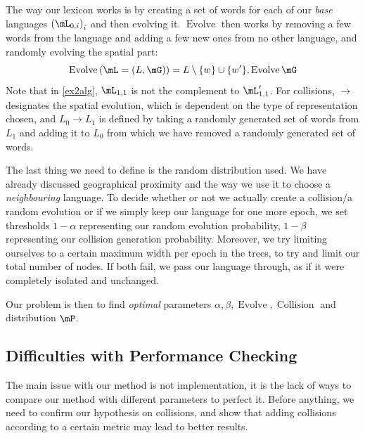 \documentclass[math, info, english]{cours}
\DeclareMathOperator{\revo}{Evolve}
\DeclareMathOperator{\coll}{Collision}
\begin{document}
The way our lexicon works is by creating a set of words for each of our \emph{base} languages $\left(\mL_{0, i}\right)_{i}$ and then evolving it.
$\revo$ then works by removing a few words from the language and adding a few new ones from no other language, and randomly evolving the spatial part:
\begin{equation*}
	\revo\left( \mL = \left(L, \mG\right) \right) = L \setminus \{w\} \cup \{w'\}, \revo\mG
\end{equation*}
Note that in \ref{ex2alg}, $\mL_{1, 1}$ is not the complement to $\mL'_{1, 1}$.
For collisions, $\to$ designates the spatial evolution, which is dependent on the type of representation chosen, and $L_{0} \to L_{1}$ is defined by taking a randomly generated set of words from $L_{1}$ and adding it to $L_{0}$ from which we have removed a randomly generated set of words.


The last thing we need to define is the random distribution used.
We have already discussed geographical proximity and the way we use it to choose a \emph{neighbouring} language.
To decide whether or not we actually create a collision/a random evolution or if we simply keep our language for one more epoch, we set thresholds $1 - \alpha$ representing our random evolution probability, $1 - \beta$ representing our collision generation probability.
Moreover, we try limiting ourselves to a certain maximum width per epoch in the trees, to try and limit our total number of nodes.
If both fail, we pass our language through, as if it were completely isolated and unchanged.

Our problem is then to find \emph{optimal} parameters $\alpha, \beta, \revo, \coll$ and distribution $\mP$.

\subsection{Difficulties with Performance Checking}
The main issue with our method is not implementation, it is the lack of ways to compare our method with different parameters to perfect it.
Before anything, we need to confirm our hypothesis on collisions, and show that adding collisions according to a certain metric may lead to better results.
\end{document}

